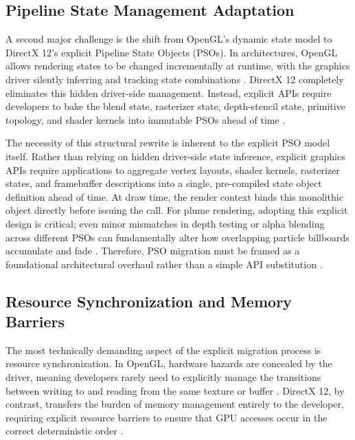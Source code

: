 \subsection{Pipeline State Management Adaptation}
A second major challenge is the shift from OpenGL’s dynamic state model to DirectX 12’s explicit Pipeline State Objects (PSOs). In architectures, OpenGL allows rendering states to be changed incrementally at runtime, with the graphics driver silently inferring and tracking state combinations \cite{Shiraef2016}. DirectX 12 completely eliminates this hidden driver-side management. Instead, explicit APIs require developers to bake the blend state, rasterizer state, depth-stencil state, primitive topology, and shader kernels into immutable PSOs ahead of time \cite{bossard2019high}. 

The necessity of this structural rewrite is inherent to the explicit PSO model itself. Rather than relying on hidden driver-side state inference, explicit graphics APIs require applications to aggregate vertex layouts, shader kernels, rasterizer states, and framebuffer descriptions into a single, pre-compiled state object definition ahead of time. At draw time, the render context binds this monolithic object directly before issuing the call. For plume rendering, adopting this explicit design is critical; even minor mismatches in depth testing or alpha blending across different PSOs can fundamentally alter how overlapping particle billboards accumulate and fade \cite{del2026interactive}. Therefore, PSO migration must be framed as a foundational architectural overhaul rather than a simple API substitution \cite{asplund2020directx}.

\subsection{Resource Synchronization and Memory Barriers}
The most technically demanding aspect of the explicit migration process is resource synchronization. In OpenGL, hardware hazards are concealed by the driver, meaning developers rarely need to explicitly manage the transitions between writing to and reading from the same texture or buffer \cite{Unterguggenberger2022}. DirectX 12, by contrast, transfers the burden of memory management entirely to the developer, requiring explicit resource barriers to ensure that GPU accesses occur in the correct deterministic order \cite{rossant2021high}. 

